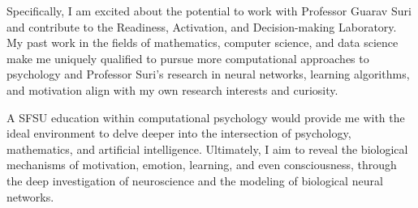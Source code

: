 \documentclass[12pt]{article}
\begin{document}
Specifically, I am excited about the potential to work with Professor Guarav Suri and contribute to the Readiness, Activation, and
Decision-making Laboratory.  My past work in the fields of mathematics, computer science, and data science make me uniquely qualified to
pursue more computational approaches to psychology and Professor Suri's research in neural networks, learning algorithms, and motivation
align with my own research interests and curiosity.

A SFSU education within computational psychology would provide me with the ideal environment to delve deeper into the intersection of
psychology, mathematics, and artificial intelligence. Ultimately, I aim to reveal the biological mechanisms of motivation, emotion,
learning, and even consciousness, through the deep investigation of neuroscience and the modeling of biological neural networks.
\end{document}
